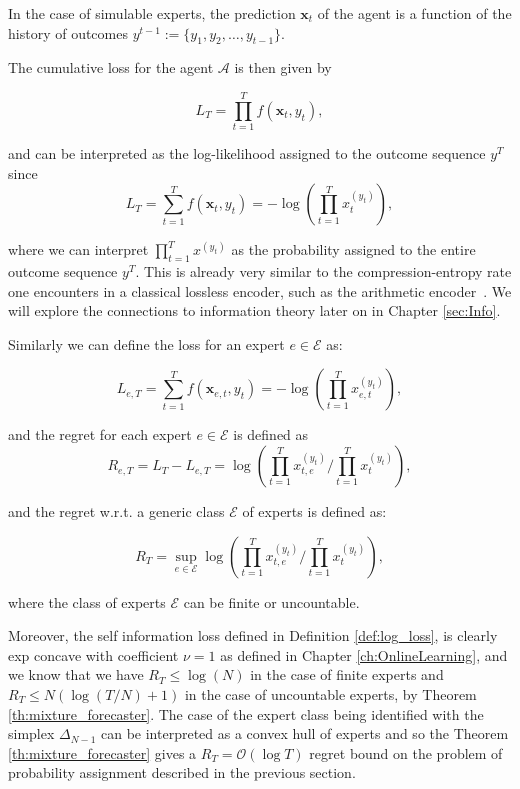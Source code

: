 In the case of simulable experts, the prediction $\mathbf x_t$ of the agent is a function of the history of outcomes $y^{t-1}:=\{y_1,y_2,\ldots,y_{t-1}\}$.

The cumulative loss for the agent $\mathcal A$ is then given by 

\begin{equation}
L_T=\prod\limits_{t=1}^T f(\mathbf x_t,y_t),
\end{equation}

and can be interpreted as the log-likelihood assigned to the outcome sequence $y^T$ since 
\begin{equation}\label{eq:loss_log}
L_T=\sum\limits_{t=1}^Tf(\mathbf x_t,y_t)=-\log\left(\prod\limits_{t=1}^T x_t^{(y_t)}\right),
\end{equation}

where we can interpret $\prod\limits_{t=1}^Tx^{(y_t)}$ as the probability assigned to the entire outcome sequence $y^T$. This is already very similar to the compression-entropy rate one encounters in a classical lossless encoder, such as the arithmetic encoder~\cite{langdon1984introduction}. We will explore the connections to information theory later on in Chapter \ref{sec:Info}.

Similarly we can define the loss for an expert $e\in\mathcal E$ as: 

\begin{equation}
L_{e,T}=\sum\limits_{t=1}^Tf(\mathbf x_{e,t},y_t)=-\log\left(\prod\limits_{t=1}^Tx_{e,t}^{(y_t)}\right),
\end{equation}

and the regret for each expert $e\in\mathcal E$ is defined as 
\begin{equation}
R_{e,T}=L_T-L_{e,T}=\log\left(\prod\limits_{t=1}^Tx_{t,e}^{(y_t)}\bigg/\prod\limits_{t=1}^Tx_t^{(y_t)}\right),
\end{equation}

and the regret w.r.t. a generic class $\mathcal E$ of experts is defined as: 

\begin{equation}
R_{T}=\sup\limits_{e\in\mathcal E}\log\left(\prod\limits_{t=1}^Tx_{t,e}^{(y_t)}\bigg/\prod\limits_{t=1}^Tx_t^{(y_t)}\right),
\end{equation}

where the class of experts $\mathcal E$ can be finite or uncountable.

Moreover, the self information loss defined in Definition \ref{def:log_loss}, is clearly exp concave with coefficient $\nu=1$ as defined in Chapter \ref{ch:OnlineLearning}, and we know that we have $R_T\le\log(N)$ in the case of finite experts and $R_T\le N(\log(T/N)+1)$ in the case of uncountable experts, by Theorem \ref{th:mixture_forecaster}. The case of the expert class being identified with the simplex $\Delta_{N-1}$ can be interpreted as a convex hull of experts and so the Theorem \ref{th:mixture_forecaster} gives a $R_T=\mathcal O(\log T)$ regret bound on the problem of probability assignment described in the previous section.

